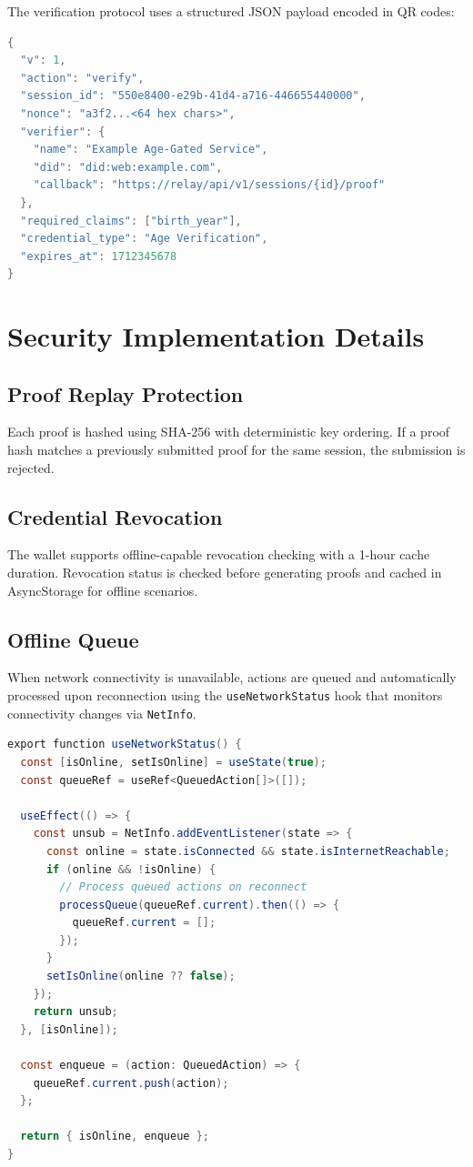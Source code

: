 The verification protocol uses a structured JSON payload encoded in QR codes:

\begin{lstlisting}[language=Java, caption={QR Code Payload Structure}]
{
  "v": 1,
  "action": "verify",
  "session_id": "550e8400-e29b-41d4-a716-446655440000",
  "nonce": "a3f2...<64 hex chars>",
  "verifier": {
    "name": "Example Age-Gated Service",
    "did": "did:web:example.com",
    "callback": "https://relay/api/v1/sessions/{id}/proof"
  },
  "required_claims": ["birth_year"],
  "credential_type": "Age Verification",
  "expires_at": 1712345678
}
\end{lstlisting}

\section{Security Implementation Details}

\subsection{Proof Replay Protection}

Each proof is hashed using SHA-256 with deterministic key ordering. If a proof hash matches a previously submitted proof for the same session, the submission is rejected.

\subsection{Credential Revocation}

The wallet supports offline-capable revocation checking with a 1-hour cache duration. Revocation status is checked before generating proofs and cached in AsyncStorage for offline scenarios.

\subsection{Offline Queue}

When network connectivity is unavailable, actions are queued and automatically processed upon reconnection using the \texttt{useNetworkStatus} hook that monitors connectivity changes via \texttt{NetInfo}.

\begin{lstlisting}[language=Java, caption={Offline Queue (useNetworkStatus.ts)}]
export function useNetworkStatus() {
  const [isOnline, setIsOnline] = useState(true);
  const queueRef = useRef<QueuedAction[]>([]);

  useEffect(() => {
    const unsub = NetInfo.addEventListener(state => {
      const online = state.isConnected && state.isInternetReachable;
      if (online && !isOnline) {
        // Process queued actions on reconnect
        processQueue(queueRef.current).then(() => {
          queueRef.current = [];
        });
      }
      setIsOnline(online ?? false);
    });
    return unsub;
  }, [isOnline]);

  const enqueue = (action: QueuedAction) => {
    queueRef.current.push(action);
  };

  return { isOnline, enqueue };
}
\end{lstlisting}

